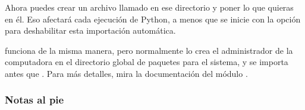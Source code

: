 \documentclass[a4,10pt,spanish]{sphinxmanual}
\begin{document}
\begin{sphinxVerbatim}[commandchars=\\\{\}]
 
\end{sphinxVerbatim}

\sphinxAtStartPar
Ahora puedes crear un archivo llamado  en ese directorio y poner lo que quieras en él.  Eso afectará cada ejecución de Python, a menos que se inicie con la opción  para deshabilitar esta importación automática.

\sphinxAtStartPar
{} funciona de la misma manera, pero normalmente lo crea el administrador de la computadora en el directorio global de paquetes para el sistema, y se importa antes que . Para más detalles, mira la documentación del módulo .
\subsubsection*{Notas al pie}

\appendix
{}\label{\detokenize{glossary::doc}}
\end{document}

